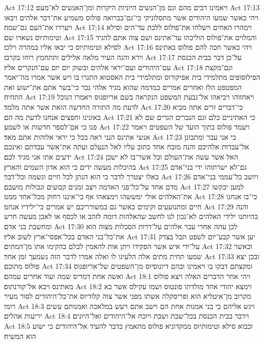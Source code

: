 Act 17:12  ויאמינו רבים מהם וגם מן־הנשים היוניות היקרות ומן־האנשים לא־מעט׃
Act 17:13  ויהי כאשר שמעו היהודים אשר מתסלוניקי כי־גם־בברואה פולוס משמיע את־דבר אלהים ויבאו ויעררו את־העם גם־שמה׃
Act 17:14  וימהרו האחים וישלחו את־פולוס ללכת עד־הים וסילא וטימותיוס נשארו שם׃
Act 17:15  והמלוים את־פולוס הוליכהו עד־אתינס ושם צוה אתם להגיד לסילא וטימותיוס כי יבאו אליו במהרה וילכו׃
Act 17:16  ויהי כאשר חכה להם פולוס באתינס וירא והנה העיר מלאה אלילים ותתחמץ רוחו בקרבו׃
Act 17:17  על־כן דבר בבית הכנסת עם־היהודים ועם־יראי אלהים ובשוק יום יום עם־הנקרים אליו׃
Act 17:18  וגם־מקצת הפילוסופים מתלמידי בית אפיקורוס ומתלמידי בית האסטוא התגרו בו ויש אשר אמרו מה־יאמר המפטפט הלז ואחרים אמרים כמדמה שהוא מגיד אלהי נכר כי־בשר אתם את־ישוע ואת התחיה׃
Act 17:19  ויאחזוהו ויביאהו אל־גבעת המשפט הנקראה בשם אריופגוס ויאמרו הנוכל לדעת מה התורה החדשה הזאת אשר אתה מלמד׃
Act 17:20  כי־דברים זרים אתה מביא באזנינו וחפצים אנחנו לדעת מה הם׃
Act 17:21  כי האתיניים כלם וגם הנכרים הגרים שם לא פנו כי אם־לספר חדשות או לשמע׃
Act 17:22  ויעמד פולוס בתוך הועד של השפטים ויאמר אנשי אתינס הנני ראה בכל כי יראי אלוהות אתם מאד׃
Act 17:23  כי אני עבר ומתבונן אל־עבדות אלהיכם והנה מזבח אחד כתוב עליו לאל הנעלם ועתה את־אשר עבדתם ואינכם ידעים אתו אני מגיד לכם׃
Act 17:24  האל אשר עשה את־העולם וכל אשר־בו לא ישכן בהיכלות מעשה ידים כי הוא אדון השמים והארץ׃
Act 17:25  גם־לא ישרתוהו ידי בני־אדם כאלו יצטרך לדבר כי הוא הנתן לכל חיים ונשמה וכל־דבר׃
Act 17:26  ויושב כל־עממי בני־אדם מדם אחד על־כל־פני האדמה ויצב זמנים קבועים וגבולות מושבם׃
Act 17:27  למען יבקשו את־האלהים אולי ימששהו וימצאהו אף כי־איננו רחוק מכל־אחד ממנו׃
Act 17:28  כי־בו אנחנו חיים ומתנועעים וקימים כאשר גם במשורריכם יש אמרים כי־ילידיו אנחנו׃
Act 17:29  והנה בהיותנו ילידי האלהים לא־נכון לנו לחשב שהאלהות דומה לזהב או לכסף או לאבן מעשה חרש ומחשבת בני אדם׃
Act 17:30  לכן עתה אחרי עבר אלהים על־דרות הסכלות מצוה הוא את־כל־בני האדם בכל־אפסי־ארץ לשוב אליו׃
Act 17:31  יען אשר קבע־יום לשפט תבל בצדק על־ידי איש אשר הפקידו ויתן אות להאמין לכלם בהקימו אתו מן־המתים׃
Act 17:32  וכאשר שמעו תחית מתים אלה הלעיגו לו ואלה אמרו לדבר הזה נשמעך זמן אחר׃
Act 17:33  ובכן יצא פולוס מתוכם׃
Act 17:34  ומקצתם דבקו בו ויאמינו ובהם דיונוסיוס מן־השפטים של־אריופגוס ואשה אחת דמריס שמה ועוד אחרים עמהם׃
Act 18:1  ויהי אחר הדברים האלה ויצא פולוס מאתינס ויבא אל־קורנתוס׃
Act 18:2  וימצא יהודי אחד מולדתו פונטוס ושמו עקילס אשר בא מקרוב מן־איטליא הוא ופריסקלה אשתו מפני אשר צוה קלודיוס את־כל־היהודים לסור מעיר רומי׃
Act 18:3  ויגש אליהם כי בני אמנות אחת הם וישב אתם ויעש במלאכה ואמנותם עשים יריעות אהלים׃
Act 18:4  וידבר בבית הכנסת בכל־שבת ושבת ויוכח אל־היהודים ואל־היונים׃
Act 18:5  וכבוא סילא וטימותיוס ממקדוניא פולוס מתאמץ בדבר להעיד אל־היהודים כי ישוע הוא המשיח׃
